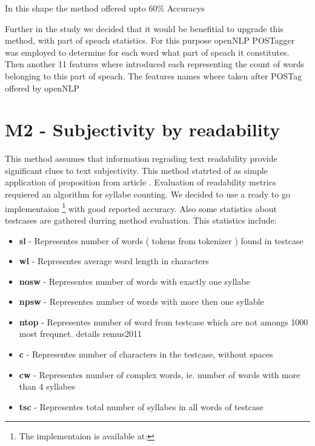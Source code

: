 In this shape the method offered upto 60\% Accuracys


Further in the study we decided that it would be benefitial to upgrade this method, with part of speach statistics. 
For this purpose openNLP POSTagger was employed to determine for each word what part of speach it constitutes. Then another 11 features where introduced each representing the count of words belonging
to this part of speach. The features names where taken after POSTag offered by openNLP


\section{M2 - Subjectivity by readability}


This method assumes that information regrading text readability provide significant clues to text subjectivity. 
This method statrted of as simple application of proposition from article \cite{remus2011}.  Evaluation of readability metrics requiered an algorithm for syllabe counting. 
We decided to use a ready to go implementaion \footnote{ The implementaion is available at: 
 } 
with good reported accuracy. Also some statistics about testcases are gathered durring method evaluation. This statistics include:
\begin{itemize}
\item \textbf{sl} - Representes number of words ( tokens from tokenizer ) found in testcase
\item \textbf{wl} - Representes average word length in characters 
\item \textbf{nosw} - Representes number of words with exactly one syllabe
\item \textbf{npsw} - Representes number of words with more then one syllable
\item \textbf{ntop} - Representes number of word from testcase which are not amongs 1000 most frequnet. details \cite{ 2.1.7 }{remus2011}
\item \textbf{c} - Representes number of characters in the testcase, without spaces
\item \textbf{cw} - Representes number of complex words, ie. number of words with more than 4 syllabes
\item \textbf{tsc} - Representes total number of syllabes in all words of testcase
\end{itemize}

